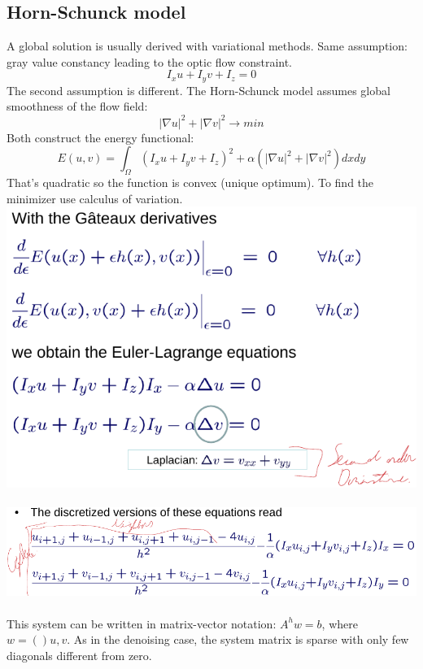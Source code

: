 \documentclass{article}
\begin{document}
\subsection{Horn-Schunck model}
A global solution is usually derived with variational methods.
Same assumption: gray value constancy leading to the optic flow constraint. \\
\begin{equation}
I_xu+I_yv+I_z=0
\end{equation}
The second assumption is different. The Horn-Schunck model assumes global smoothness of the flow field:
\begin{equation}
|\nabla u|^2+|\nabla v|^2 \rightarrow min
\end{equation}
Both construct the energy functional:
\begin{equation}
E(u,v)=\int_{\Omega}(I_xu+I_yv+I_z)^2+\alpha(|\nabla u|^2+|\nabla v|^2) dxdy
\end{equation}
That's quadratic so the function is convex (unique optimum). To find the minimizer use calculus of variation.\\
\includegraphics[scale=0.3]{58.png}\\\\
\includegraphics[scale=0.3]{59.png}\\\\
This system can be written in matrix-vector notation: $A^hw=b$, where $w=()u,v$. As in the denoising case, the system matrix is sparse with only few diagonals different from zero.\\
\end{document}
